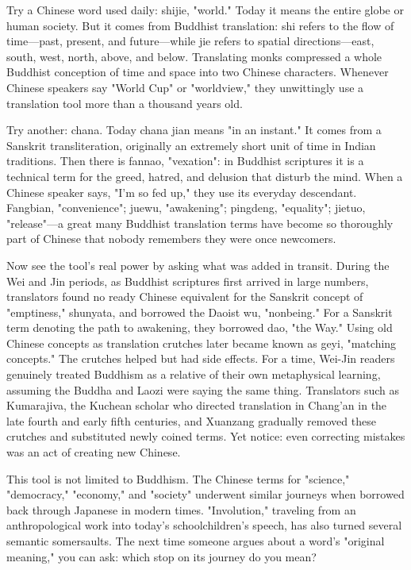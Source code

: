 Try a Chinese word used daily: shijie, "world." Today it means the entire globe or human society. But it comes from Buddhist translation: shi refers to the flow of time---past, present, and future---while jie refers to spatial directions---east, south, west, north, above, and below. Translating monks compressed a whole Buddhist conception of time and space into two Chinese characters. Whenever Chinese speakers say "World Cup" or "worldview," they unwittingly use a translation tool more than a thousand years old.

Try another: chana. Today chana jian means "in an instant." It comes from a Sanskrit transliteration, originally an extremely short unit of time in Indian traditions. Then there is fannao, "vexation": in Buddhist scriptures it is a technical term for the greed, hatred, and delusion that disturb the mind. When a Chinese speaker says, "I'm so fed up," they use its everyday descendant. Fangbian, "convenience"; juewu, "awakening"; pingdeng, "equality"; jietuo, "release"---a great many Buddhist translation terms have become so thoroughly part of Chinese that nobody remembers they were once newcomers.

Now see the tool's real power by asking what was added in transit. During the Wei and Jin periods, as Buddhist scriptures first arrived in large numbers, translators found no ready Chinese equivalent for the Sanskrit concept of "emptiness," shunyata, and borrowed the Daoist wu, "nonbeing." For a Sanskrit term denoting the path to awakening, they borrowed dao, "the Way." Using old Chinese concepts as translation crutches later became known as geyi, "matching concepts." The crutches helped but had side effects. For a time, Wei-Jin readers genuinely treated Buddhism as a relative of their own metaphysical learning, assuming the Buddha and Laozi were saying the same thing. Translators such as Kumarajiva, the Kuchean scholar who directed translation in Chang'an in the late fourth and early fifth centuries, and Xuanzang gradually removed these crutches and substituted newly coined terms. Yet notice: even correcting mistakes was an act of creating new Chinese.

This tool is not limited to Buddhism. The Chinese terms for "science," "democracy," "economy," and "society" underwent similar journeys when borrowed back through Japanese in modern times. "Involution," traveling from an anthropological work into today's schoolchildren's speech, has also turned several semantic somersaults. The next time someone argues about a word's "original meaning," you can ask: which stop on its journey do you mean?

